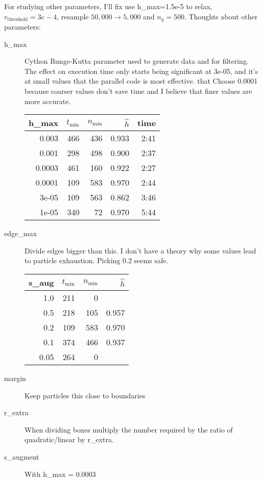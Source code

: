 \documentclass[12pt]{article}
\begin{document}
For studying other parameters, I'll fix use h\_max=1.5e-5 to relax,
$r_{\text{threshold}} = 3e-4$, resample $50,000 \rightarrow 5,000$ and
$n_y = 500$.  Thoughts about other parameters:
\begin{description}
\item[h\_max] Cython Runge-Kutta parameter used to generate data and
  for filtering.  The effect on execution time only starts being
  significant at 3e-05, and it's at small values that the parallel
  code is most effective.  that Choose 0.0001 because coarser values
  don't save time and I believe that finer values are more accurate.\\
  \begin{tabular*}{1.0\linewidth}{rrrrr} \\
    h\_max &$t_{\text{min}}$&$n_{\text{min}}$&$\hat h$ & time \\ \hline
    0.003  & 466 & 436 & 0.933 & 2:41\\
    0.001  & 298 & 498 & 0.900 & 2:37 \\
    0.0003 & 461 & 160 & 0.922 & 2:27 \\
    0.0001 & 109 & 583 & 0.970 & 2:44 \\
    3e-05  & 109 & 563 & 0.862 & 3:46 \\
    1e-05  & 340 &  72 & 0.970 & 5:44
  \end{tabular*}
\item[edge\_max] Divide edges bigger than this.  I don't have a theory
  why some values lead to particle exhaustion.  Picking 0.2 seems safe.\\
  \begin{tabular*}{1.0\linewidth}{rrrr} \\
    s\_aug &$t_{\text{min}}$&$n_{\text{min}}$&$\hat h$ \\ \hline
    1.0  & 211         &0 \\
    0.5  & 218         & 105         & 0.957 \\ 
    0.2  & 109         & 583         & 0.970 \\
    0.1  & 374         & 466         & 0.937 \\
    0.05 & 264         & 0           & 
  \end{tabular*}
\item[margin] Keep particles this close to boundaries
\item[r\_extra] When dividing boxes multiply the number required by
  the ratio of quadratic/linear by r\_extra.
\item[s\_augment] With h\_max = 0.0003\\

\end{description}
\end{document}
